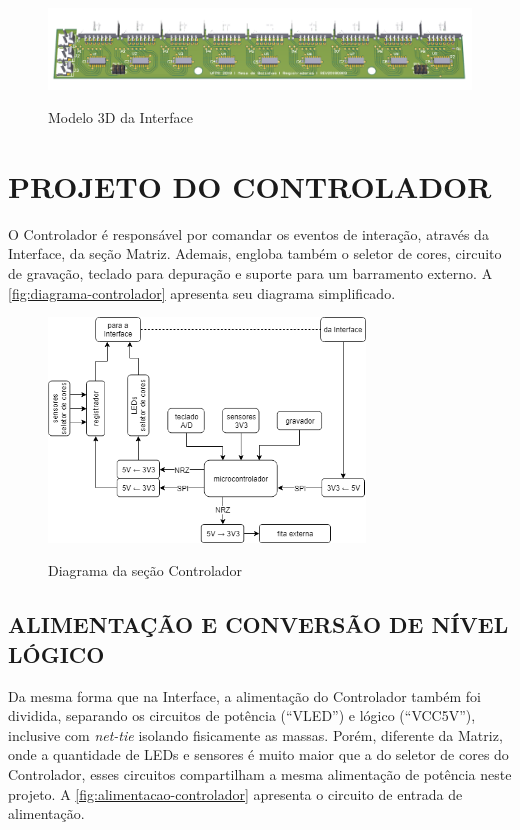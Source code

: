 \begin{figure}[H]
    \centering
    \caption{Modelo 3D da Interface}
    \includegraphics[width=1.0\textwidth]{./dados/figuras/interface-3d}
    \label{fig:3d-interface}
\end{figure}

\section{PROJETO DO CONTROLADOR}
\label{sec:controlador}

O Controlador é responsável por comandar os eventos de interação, através da Interface, da seção Matriz. Ademais, engloba também o seletor de cores, circuito de gravação, teclado para depuração e suporte para um barramento externo. A \autoref{fig:diagrama-controlador} apresenta seu diagrama simplificado.

\begin{figure}[H]
    \centering
    \caption{Diagrama da seção Controlador}
    \includegraphics[width=0.75\textwidth]{./dados/figuras/diagrama-controlador}
    \label{fig:diagrama-controlador}
\end{figure}

\subsection{ALIMENTAÇÃO  E CONVERSÃO DE NÍVEL LÓGICO}
\label{subsec:alimentacao}

Da mesma forma que na Interface, a alimentação do Controlador também foi dividida, separando os circuitos de potência (``VLED'') e lógico (``VCC5V''), inclusive com \emph{net-tie} isolando fisicamente as massas. Porém, diferente da Matriz, onde a quantidade de LEDs e sensores é muito maior que a do seletor de cores do Controlador, esses circuitos compartilham a mesma alimentação de potência neste projeto. A \autoref{fig:alimentacao-controlador} apresenta o circuito de entrada de alimentação.

